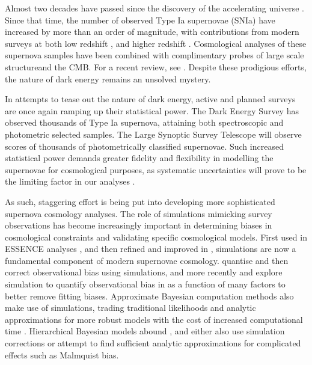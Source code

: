 \documentclass[a4paper,fleqn,usenatbib]{mnras}
\begin{document}
Almost two decades have passed since the discovery of the accelerating universe \citep{Riess1998, Perlmutter1999}. Since that time, the number of observed Type Ia supernovae (SNIa) have increased by more than an order of magnitude, with contributions from modern surveys at both low redshift \citep{Bailey2008, Freedman2009, Hicken2009,  Contreras2010, Conley2011}, and higher redshift \citep{Astier2006, Wood-Vasey2007, Frieman2008, Balland2009, Amanullah2010, Sako2014}. Cosmological analyses of these supernova samples \citep{Kowalski2008, Kessler2009, Conley2011, Suzuki2012, Betoule2014, Rest2014} have been combined with complimentary probes of large scale structureand the CMB. For a recent review, see \citet{Huterer2018}. Despite these prodigious efforts, the nature of dark energy remains an unsolved mystery.


In attempts to tease out the nature of dark energy, active and planned surveys are once again ramping up their statistical power. The Dark Energy Survey \citep[DES,][]{Bernstein2012, Abbott2016} has observed thousands of Type Ia supernova, attaining both spectroscopic and photometric selected samples. The Large Synoptic Survey Telescope \citep[LSST,][]{Ivezic2008, LSSTScienceCollaboration2009} will observe scores of thousands of photometrically classified supernovae. Such increased statistical power demands greater fidelity and flexibility in modelling the supernovae for cosmological purposes, as systematic uncertainties will prove to be the limiting factor in our analyses \citep{Betoule2014}.


As such, staggering effort is being put into developing more sophisticated supernova cosmology analyses. The role of simulations mimicking survey observations has become increasingly important in determining biases in cosmological constraints and validating specific cosmological models. First used in ESSENCE analyses \citep{Wood-Vasey2007}, and then refined and improved in \citet{Kessler2009}, simulations are now a fundamental component of modern supernovae cosmology.  \citet{Betoule2014} quantise and then correct observational bias using simulations, and more recently \citet{Scolnic2016} and \citet{Kessler2017} explore simulation to quantify observational bias in as a function of many factors to better remove fitting biases. Approximate Bayesian computation methods also make use of simulations, trading traditional likelihoods and analytic approximations for more robust models with the cost of increased computational time \citep{Weyant2013, Jennings2016}. Hierarchical Bayesian models abound \citep{Mandel2009, March2011, March2014, Rubin2015, Shariff2016, Roberts2017}, and either also use simulation corrections or attempt to find sufficient analytic approximations for complicated effects such as Malmquist bias.
\end{document}
